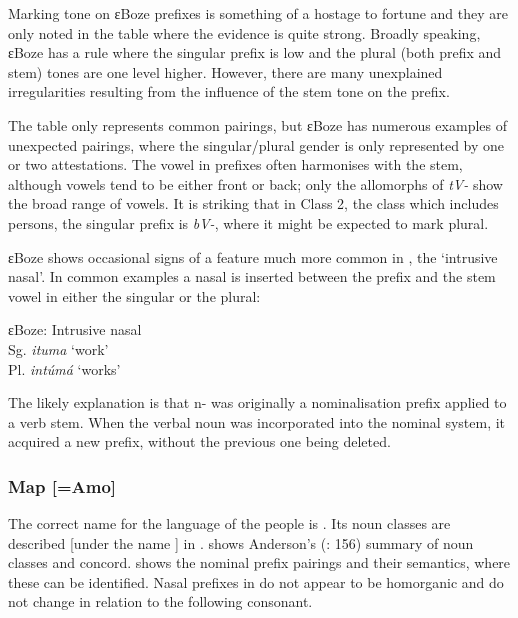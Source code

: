 \documentclass[output=paper]{langsci/langscibook}
\begin{document}
Marking tone on ɛBoze prefixes is something of a hostage to fortune and they are only noted in the table where the evidence is quite strong. Broadly speaking, ɛBoze has a rule where the singular prefix is low and the plural (both prefix and stem) tones are one level higher. However, there are many unexplained irregularities resulting from the influence of the stem tone on the prefix.

\newpage 
The table only represents common pairings, but ɛBoze has numerous examples of unexpected pairings, where the singular/plural gender is only represented by one or two attestations. The vowel in prefixes often harmonises with the stem, although vowels tend to be either front or back; only the allomorphs of \textit{tV-} show the broad range of vowels. It is striking that in Class 2, the class which includes persons, the singular prefix is \textit{bV-}, where it might be expected to mark plural.

 
ɛBoze shows occasional signs of a feature much more common in , the ‘intrusive nasal’. In common examples a nasal is inserted between the prefix and the stem vowel in either the singular or the plural:

\ea
ɛBoze: Intrusive nasal\\
    Sg. \textit{ituma}  ‘work’\\
    Pl. \textit{intúmá} ‘works’\\
\z    



The likely explanation is that n- was originally a nominalisation prefix applied to a verb stem. When the verbal noun was incorporated into the nominal system, it acquired a new prefix, without the previous one being deleted.

\subsubsection{Map [=Amo]}

The correct name for the language of the  people is . Its noun classes are described [under the name ] in \citep{DiLuzio1972,Anderson1980}.  shows Anderson’s (\citeyear{Anderson1980}: 156) summary of  noun classes and concord.  shows the  nominal prefix pairings and their semantics, where these can be identified. Nasal prefixes in  do not appear to be homorganic and do not change in relation to the following consonant.
\end{document}
